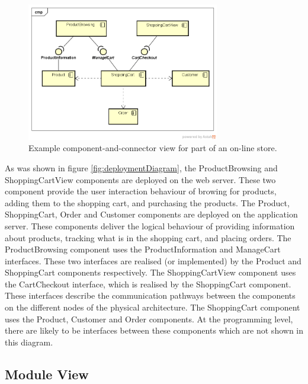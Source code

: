 \begin{figure}[h]
    \centering
    \includegraphics[trim=37 45 20 48,clip,width=0.75\textwidth]{images/component_diagram.png}
    \caption{Example component-and-connector view for part of an on-line store.}
    \label{fig:componentDiagram}
\end{figure}

As was shown in figure \ref{fig:deploymentDiagram}, the ProductBrowsing and ShoppingCartView components are deployed on the web server.
These two component provide the user interaction behaviour of browing for products, adding them to the shopping cart, and purchasing the products.
The Product, ShoppingCart, Order and Customer components are deployed on the application server.
These components deliver the logical behaviour of providing information about products, tracking what is in the shopping cart, and placing orders.
The ProductBrowsing component uses the ProductInformation and ManageCart interfaces.
These two interfaces are realised (or implemented) by the Product and ShoppingCart components respectively.
The ShoppingCartView component uses the CartCheckout interface, which is realised by the ShoppingCart component.
These interfaces describe the communication pathways between the components on the different nodes of the physical architecture.
The ShoppingCart component uses the Product, Customer and Order components.
At the programming level, there are likely to be interfaces between these components which are not shown in this diagram.

\subsection{Module View}
